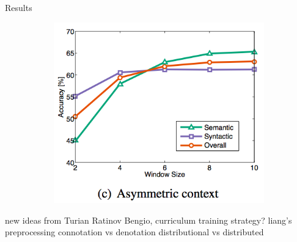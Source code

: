 \begin{frame}{Results}
\begin{figure}
\begin{subfigure}[b]{0.33\textwidth}
    \end{subfigure}%
    \begin{subfigure}[b]{0.33\textwidth}
      \includegraphics[width=\textwidth]{images/analogy3.png}
    \end{subfigure}%
  \end{figure}
\end{frame}


\begin{frame}
  new ideas from Turian Ratinov Bengio,
  curriculum training strategy?
  liang's preprocessing
  connotation vs denotation
  distributional vs distributed
\end{frame}
